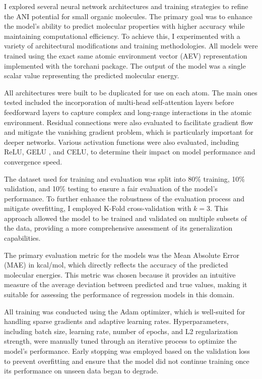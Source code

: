 \documentclass[11pt, twocolumn]{article}
\begin{document}
I explored several neural network architectures and training strategies to refine the ANI potential for small organic molecules. The primary goal was to enhance the model's ability to predict molecular properties with higher accuracy while maintaining computational efficiency. To achieve this, I experimented with a variety of architectural modifications and training methodologies. All models were trained using the exact same atomic environment vector (AEV) representation implemented with the torchani package. \cite{gao2020torchani} The output of the model was a single scalar value representing the predicted molecular energy.

All architectures were built to be duplicated for use on each atom. The main ones tested included the incorporation of multi-head self-attention layers \cite{vaswani2017attention} before feedforward layers to capture complex and long-range interactions in the atomic environment. Residual connections were also evaluated to facilitate gradient flow and mitigate the vanishing gradient problem, which is particularly important for deeper networks. Various activation functions were also evaluated, including ReLU, GELU \cite{hendrycks2016gaussian}, and CELU, to determine their impact on model performance and convergence speed.

The dataset used for training and evaluation was split into 80\% training, 10\% validation, and 10\% testing to ensure a fair evaluation of the model's performance. To further enhance the robustness of the evaluation process and mitigate overfitting, I employed K-Fold cross-validation with $k=3$. This approach allowed the model to be trained and validated on multiple subsets of the data, providing a more comprehensive assessment of its generalization capabilities.

 The primary evaluation metric for the models was the Mean Absolute Error (MAE) in kcal/mol, which directly reflects the accuracy of the predicted molecular energies. This metric was chosen because it provides an intuitive measure of the average deviation between predicted and true values, making it suitable for assessing the performance of regression models in this domain.

All training was conducted using the Adam optimizer, which is well-suited for handling sparse gradients and adaptive learning rates. Hyperparameters, including batch size, learning rate, number of epochs, and L2 regularization strength, were manually tuned through an iterative process to optimize the model's performance. Early stopping was employed based on the validation loss to prevent overfitting and ensure that the model did not continue training once its performance on unseen data began to degrade.
\end{document}
